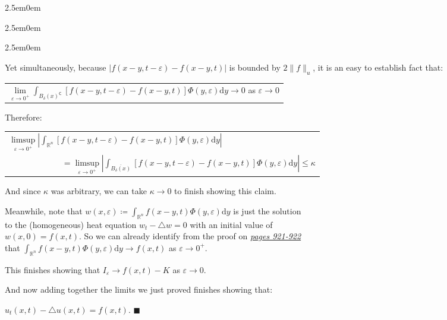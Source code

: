\documentclass{book}
\newcommand{\inLinkRap}[2]{{\color{blue}\hyperlink{#1}{\textit{#2}}}}
\newenvironment{myIndent}{%
   \begin{adjustwidth}{2.5em}{0em}%
}{%
   \end{adjustwidth}%
}
\newcommand{\comp}{\mathsf{C}}
\newcommand{\df}{\mathrm{d}}
\newcommand{\retTwo}{\hfill\bigbreak}
\begin{document}
\begin{myIndent}
\begin{myIndent}
\begin{myIndent}
			Yet simultaneously, because $|f(x - y, t - \varepsilon) - f(x - y, t)|$ is bounded by $2\|f\|_u$, it is an easy to establish fact that:

			{\centering\begin{tabular}{l}
				$\lim\limits_{\varepsilon \to 0^+}\int_{B_\delta(x)^\comp} \left[f(x - y, t - \varepsilon) - f(x - y, t)\right]\Phi(y, \varepsilon)\df y \to 0$ as $\varepsilon \to 0$
			\end{tabular}\retTwo\par}

			Therefore:
			
			{\centering\begin{tabular}{l}
				$\limsup\limits_{\varepsilon \to 0^+}\left|\int_{\mathbb{R}^n} \left[f(x - y, t - \varepsilon) - f(x - y, t)\right]\Phi(y, \varepsilon)\df y\right|$\\ [8pt]
				$\phantom{aaaaaaaaaaaa} = \limsup\limits_{\varepsilon \to 0^+}\left|\int_{\overline{B_\delta(x)}} \left[f(x - y, t - \varepsilon) - f(x - y, t)\right]\Phi(y, \varepsilon)\df y\right| \leq \kappa$
			\end{tabular}\retTwo\par}

			And since $\kappa$ was arbitrary, we can take $\kappa \to 0$ to finish showing this claim.\retTwo
		\end{myIndent}

		Meanwhile, note that $w(x, \varepsilon) \coloneqq \int_{\mathbb{R}^n} f(x - y, t)\Phi(y, \varepsilon)\df y$ is just the solution\\ to the (homogeneous) heat equation $w_t - \triangle w = 0$ with an initial value of\\ $w(x, 0) = f(x, t)$. So we can already identify from the proof on \inLinkRap{Heat Equation Homogeneous Solution page 921}{pages 921-922}\\ that $\int_{\mathbb{R}^n} f(x - y, t)\Phi(y, \varepsilon)\df y \to f(x, t)$ as $\varepsilon \to 0^+$.\retTwo

		This finishes showing that $I_\varepsilon \to f(x, t) - K$ as $\varepsilon \to 0$.\retTwo
	\end{myIndent}

	And now adding together the limits we just proved finishes showing that:
	
	{\centering$u_t(x, t) - \triangle u(x, t) = f(x, t)$. $\blacksquare$\newpage\par}
\end{myIndent}
\end{document}
